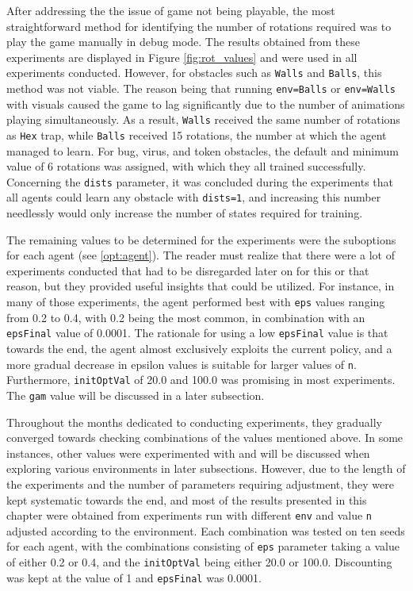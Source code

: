 After addressing the the issue of game not being playable, the most straightforward method for identifying the number of rotations required was to play the game manually in debug mode. The results obtained from these experiments are displayed in Figure \ref{fig:rot_values} and were used in all experiments conducted. However, for obstacles such as \texttt{Walls} and \texttt{Balls}, this method was not viable. The reason being that running \texttt{env=Balls} or \texttt{env=Walls} with visuals caused the game to lag significantly due to the number of animations playing simultaneously. As a result, \texttt{Walls} received the same number of rotations as \texttt{Hex} trap, while \texttt{Balls} received 15 rotations, the number at which the agent managed to learn. For bug, virus, and token obstacles, the default and minimum value of 6 rotations was assigned, with which they all trained successfully.
Concerning the \texttt{dists} parameter, it was concluded during the experiments that all agents could learn any obstacle with \texttt{dists=1}, and increasing this number needlessly would only increase the number of states required for training. 

The remaining values to be determined for the experiments were the suboptions for each agent (see \ref{opt:agent}).  The reader must realize that there were a lot of experiments conducted that had to be disregarded later on for this or that reason, but they provided useful insights that could be utilized. For instance, in many of those experiments, the agent performed best with \texttt{eps} values ranging from 0.2 to 0.4, with 0.2 being the most common, in combination with an \texttt{epsFinal} value of 0.0001. The rationale for using a low \texttt{epsFinal} value is that towards the end, the agent almost exclusively exploits the current policy, and a more gradual decrease in epsilon values is suitable for larger values of \texttt{n}. Furthermore, \texttt{initOptVal} of 20.0 and 100.0 was promising in most experiments. The \texttt{gam} value will be discussed in a later subsection.

Throughout the months dedicated to conducting experiments, they gradually converged towards checking combinations of the values mentioned above. In some instances, other values were experimented with and will be discussed when exploring various environments in later subsections. However, due to the length of the experiments and the number of parameters requiring adjustment, they were kept systematic towards the end, and most of the results presented in this chapter were obtained from experiments run with different \texttt{env} and value \texttt{n} adjusted according to the environment. Each combination was tested on ten seeds for each agent, with the combinations consisting of \texttt{eps} parameter taking a value of either 0.2 or 0.4, and the \texttt{initOptVal} being either 20.0 or 100.0. Discounting was kept at the value of 1 and \texttt{epsFinal} was 0.0001.

